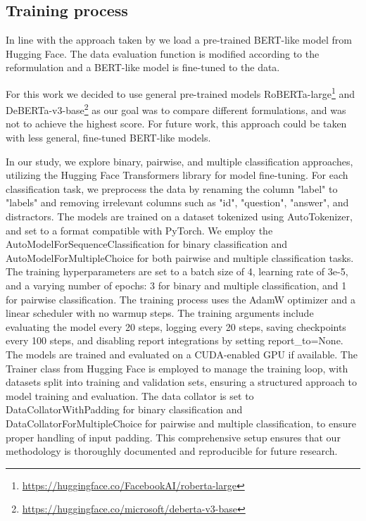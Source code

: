\subsection{Training process}
In line with the approach taken by \citep{ails-lab} we load a pre-trained BERT-like model from Hugging Face.
The data evaluation function is modified according to the reformulation and a BERT-like model is fine-tuned to the data.

For this work we decided to use general pre-trained models RoBERTa-large\footnote[4]{\url{https://huggingface.co/FacebookAI/roberta-large}} \citep{roberta} and DeBERTa-v3-base\footnote[5]{\url{https://huggingface.co/microsoft/deberta-v3-base}} \citep{deberta,debertav3} as our goal was to compare different formulations, and was not to achieve the highest score.
For future work, this approach could be taken with less general, fine-tuned BERT-like models.

In our study, we explore binary, pairwise, and multiple classification approaches, utilizing the Hugging Face Transformers library for model fine-tuning. 
For each classification task, we preprocess the data by renaming the column "label" to "labels" and removing irrelevant columns such as "id", "question", "answer", 
and distractors. The models are trained on a dataset tokenized using AutoTokenizer, and set to a format compatible with PyTorch. We employ the
AutoModelForSequenceClassification for binary classification and AutoModelForMultipleChoice for both pairwise and multiple classification tasks. 
The training hyperparameters are set to a batch size of 4, learning rate of 3e-5, and a varying number of epochs: 3 for binary and multiple classification, 
and 1 for pairwise classification. The training process uses the AdamW optimizer and a linear scheduler with no warmup steps. The training arguments include 
evaluating the model every 20 steps, logging every 20 steps, saving checkpoints every 100 steps, and disabling report integrations by setting report\_to=None. 
The models are trained and evaluated on a CUDA-enabled GPU if available. The Trainer class from Hugging Face is employed to manage the training loop, with datasets 
split into training and validation sets, ensuring a structured approach to model training and evaluation. The data collator is set to DataCollatorWithPadding for
binary classification and DataCollatorForMultipleChoice for pairwise and multiple classification, to ensure proper handling of input padding. This comprehensive
setup ensures that our methodology is thoroughly documented and reproducible for future research.
